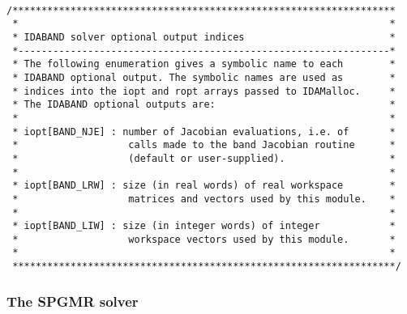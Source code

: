 \documentclass[11pt]{article}
\begin{document}
\small
\begin{verbatim}

/******************************************************************
 *                                                                *
 * IDABAND solver optional output indices                         *
 *----------------------------------------------------------------*
 * The following enumeration gives a symbolic name to each        *
 * IDABAND optional output. The symbolic names are used as        *
 * indices into the iopt and ropt arrays passed to IDAMalloc.     *
 * The IDABAND optional outputs are:                              *
 *                                                                *
 * iopt[BAND_NJE] : number of Jacobian evaluations, i.e. of       *
 *                   calls made to the band Jacobian routine      *
 *                   (default or user-supplied).                  *
 *                                                                *
 * iopt[BAND_LRW] : size (in real words) of real workspace        *
 *                   matrices and vectors used by this module.    *
 *                                                                *
 * iopt[BAND_LIW] : size (in integer words) of integer            *
 *                   workspace vectors used by this module.       *
 *                                                                *
 ******************************************************************/

\end{verbatim}
\normalsize


\subsubsection{The SPGMR solver}
\end{document}
